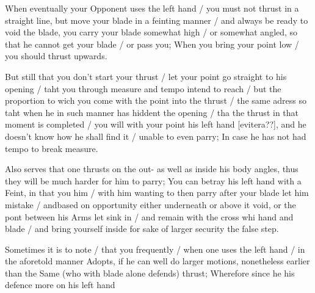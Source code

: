 When eventually your Opponent uses the left hand / you must not thrust
in a straight line, but move your blade in a feinting manner / and
always be ready to void the blade, you carry your blade somewhat high
/ or somewhat angled, so that he cannot get your blade / or pass you;
When you bring your point low / you should thrust upwards.


But still that you don't start your thrust / let your point go straight to
his opening / taht you through measure and tempo intend to reach  /
but the proportion to wich you come with the point into the thrust /
the same adress so taht when he in such manner has hiddent the opening
/ tha the thrust in that moment is completed / you will with your
point his left hand [evitera??], and he doesn't know how he shall find it / unable to
even parry; In case he has not had tempo to break measure.


Also serves that one thrusts on the out- as well as inside his body
angles, thus they will be much harder for him to parry; You can betray
his left hand with a Feint, in that you him / with him wanting to
then parry after your blade let him mistake / andbased on  opportunity
either underneath or above it void, or the pont between his Arms let
sink in / and remain with the cross whi hand and blade / and bring
yourself inside for sake of larger security the false step.


Sometimes it is to note / that you frequently / when one uses the left
hand / in the aforetold manner Adopts, if he can well do larger
motions, nonetheless earlier than the Same (who with blade alone
defends) thrust; Wherefore since he his defence more on his left hand